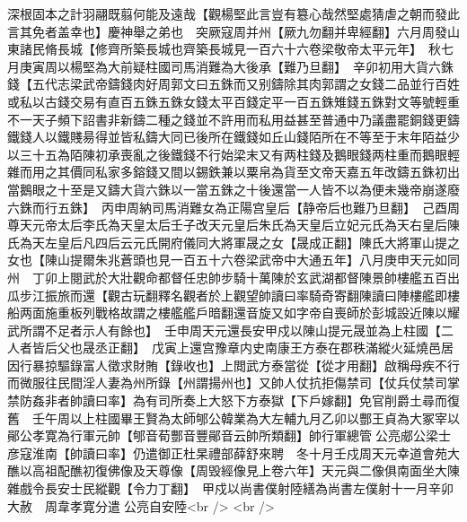 深根固本之計羽翮既翦何能及遠哉【觀楊堅此言豈有簒心哉然堅處猜虐之朝而發此言其免者盖幸也】慶神舉之弟也　突厥寇周并州【厥九勿翻并卑經翻】六月周發山東諸民脩長城【修齊所築長城也齊築長城見一百六十六卷梁敬帝太平元年】　秋七月庚寅周以楊堅為大前疑柱國司馬消難為大後承【難乃旦翻】　辛卯初用大貨六銖錢【五代志梁武帝鑄錢肉好周郭文曰五銖而又别鑄除其肉郭謂之女錢二品並行百姓或私以古錢交易有直百五銖五銖女錢太平百錢定平一百五銖雉錢五銖對文等號輕重不一天子頻下詔書非新鑄二種之錢並不許用而私用益甚至普通中乃議盡罷銅錢更鑄鐵錢人以鐵賤昜得並皆私鑄大同已後所在鐵錢如丘山錢陌所在不等至于末年陌益少以三十五為陌陳初承喪亂之後鐵錢不行始梁末又有两柱錢及鵝眼錢两柱重而鵝眼輕雜而用之其價同私家多鎔錢又間以錫鉄兼以粟帛為貨至文帝天嘉五年改鑄五銖初出當鵝眼之十至是又鑄大貨六銖以一當五銖之十後還當一人皆不以為便未幾帝崩遂廢六銖而行五銖】　丙申周納司馬消難女為正陽宫皇后【静帝后也難乃旦翻】　己酉周尊天元帝太后李氏為天皇太后壬子改天元皇后朱氏為天皇后立妃元氏為天右皇后陳氏為天左皇后凡四后云元氏開府儀同大將軍晟之女【晟成正翻】陳氏大將軍山提之女也【陳山提爾朱兆蒼頭也見一百五十六卷梁武帝中大通五年】八月庚申天元如同州　丁卯上閱武於大壯觀命都督任忠帥步騎十萬陳於玄武湖都督陳景帥樓艦五百出瓜步江振旅而還【觀古玩翻釋名觀者於上觀望帥讀曰率騎奇寄翻陳讀曰陣樓艦即樓船两面施重板列戰格故謂之樓艦艦戶暗翻還音旋又如字帝自喪師於彭城設近陳以耀武所謂不足者示人有餘也】　壬申周天元還長安甲戍以陳山提元晟並為上柱國【二人者皆后父也晟丞正翻】　戊寅上還宫豫章内史南康王方泰在郡秩滿縱火延燒邑居因行暴掠驅錄富人徵求財賄【錄收也】上閲武方泰當從【從才用翻】啟稱母疾不行而微服往民間淫人妻為州所錄【州謂揚州也】又帥人仗抗拒傷禁司【仗兵仗禁司掌禁防姦非者帥讀曰率】為有司所奏上大怒下方泰獄【下戶嫁翻】免官削爵土尋而復舊　壬午周以上柱國畢王賢為太師郇公韓業為大左輔九月乙卯以酆王貞為大冢宰以鄖公孝寛為行軍元帥【郇音荀酆音豐鄖音云帥所類翻】帥行軍總管公亮郕公梁士彦寇淮南【帥讀曰率】仍遣御正杜杲禮部薛舒來聘　冬十月壬戍周天元幸道會苑大醮以高祖配醮初復佛像及天尊像【周毁經像見上卷六年】天元與二像俱南面坐大陳雜戲令長安士民縱觀【令力丁翻】　甲戍以尚書僕射陸繕為尚書左僕射十一月辛卯大赦　周韋孝寛分遣公亮自安陸<br />
<br />
